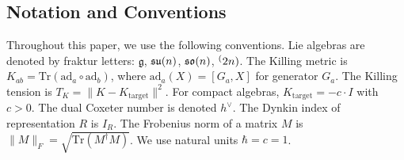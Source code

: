 \subsection{Notation and Conventions}\label{sec:notation}

Throughout this paper, we use the following conventions. Lie algebras are denoted by fraktur letters: $\mathfrak{g}$, $\mathfrak{su}(n)$, $\mathfrak{so}(n)$, $\sp(2n)$. The Killing metric is $K_{ab} = \mathrm{Tr}(\mathrm{ad}_a \circ \mathrm{ad}_b)$, where $\mathrm{ad}_a(X) = [G_a, X]$ for generator $G_a$. The Killing tension is $T_K = \|K - K_{\mathrm{target}}\|^2$. For compact algebras, $K_{\mathrm{target}} = -c \cdot I$ with $c > 0$. The dual Coxeter number is denoted $h^\vee$. The Dynkin index of representation $R$ is $I_R$. The Frobenius norm of a matrix $M$ is $\|M\|_F = \sqrt{\mathrm{Tr}(M^\dagger M)}$. We use natural units $\hbar = c = 1$.
